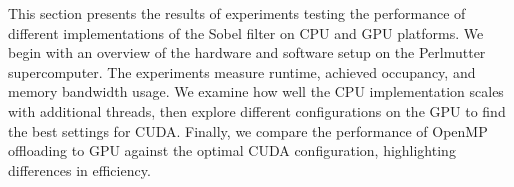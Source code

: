 
This section presents the results of experiments testing the performance of different implementations of the Sobel filter on CPU and GPU platforms. We begin with an overview of the hardware and software setup on the Perlmutter supercomputer. The experiments measure runtime, achieved occupancy, and memory bandwidth usage. We examine how well the CPU implementation scales with additional threads, then explore different configurations on the GPU to find the best settings for CUDA. Finally, we compare the performance of OpenMP offloading to GPU against the optimal CUDA configuration, highlighting differences in efficiency.

